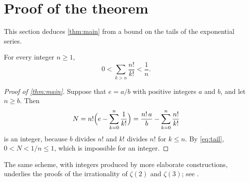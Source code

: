 \section{Proof of the theorem}\label{sec:proof}

This section deduces \cref{thm:main} from a bound on the tails of the exponential
series.

\begin{lemma}\label{lem:tail}
For every integer $n\ge1$,
\begin{equation}\label{eq:tail}
  0<\sum_{k>n}\frac{n!}{k!}<\frac1n .
\end{equation}
\end{lemma}

\begin{proof}[Proof of \cref{thm:main}]
Suppose that $e=a/b$ with positive integers $a$ and $b$, and let $n\ge b$. Then
\[
  N=n!\Bigl(e-\sum_{k=0}^{n}\frac1{k!}\Bigr)=\frac{n!\,a}{b}-\sum_{k=0}^{n}\frac{n!}{k!}
\]
is an integer, because $b$ divides $n!$ and $k!$ divides $n!$ for $k\le n$. By
\eqref{eq:tail}, $0<N<1/n\le1$, which is impossible for an integer.
\end{proof}

\begin{remark}
The same scheme, with integers produced by more elaborate constructions, underlies the
proofs of the irrationality of $\zeta(2)$ and $\zeta(3)$; see \cite{beukers1979note}.
\end{remark}
